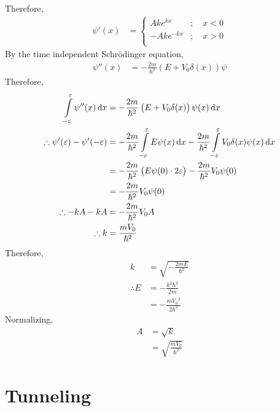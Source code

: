 \documentclass[titlepage, fleqn, a4paper, 12pt, twoside]{article}
\theoremstyle{definition}
\theoremstyle{theorem}
\begin{document}
Therefore,
\begin{align*}
	\psi'(x) &=
		\begin{cases}
			A k e^{k x} &;\quad x < 0\\
			-A k e^{-k x} &;\quad x > 0\\
		\end{cases}
\end{align*}
By the time independent Schrödinger equation,
\begin{align*}
	\psi''(x) &= -\frac{2 m}{\hbar^2} \left( E + V_0 \delta(x) \right) \psi
\end{align*}
Therefore,
\begin{align*}
	\int\limits_{-\varepsilon}^{\varepsilon} \psi''(x) \dif x &= -\frac{2 m}{\hbar^2} \left( E + V_0 \delta(x) \right) \psi(x) \dif x\\
	\therefore \psi'(\varepsilon) - \psi'(-\varepsilon) &= -\frac{2 m}{\hbar^2} \int\limits_{-\varepsilon}^{\varepsilon} E \psi(x) \dif x - \frac{2 m}{\hbar^2} \int\limits_{-\varepsilon}^{\varepsilon} V_0 \delta(x) \psi(x) \dif x\\
	&= -\frac{2 m}{\hbar^2} \left( E \psi(0) \cdot 2 \varepsilon \right) - \frac{2 m}{\hbar^2} V_0 \psi(0)\\
	&= -\frac{2 m}{\hbar^2} V_0 \psi(0)\\
	\therefore -k A - k A &= -\frac{2 m}{\hbar^2} V_0 A\\
	\therefore k &= \frac{m V_0}{\hbar^2}
\end{align*}
Therefore,
\begin{align*}
	k &= \sqrt{-\frac{2 m E}{\hbar^2}}\\
	\therefore E &= -\frac{k^2 \hbar^2}{2 m}\\
	&= -\frac{m {V_0}^2}{2 \hbar^2}
\end{align*}
Normalizing,
\begin{align*}
	A &= \sqrt{k}\\
	&= \sqrt{\frac{m V_0}{\hbar^2}}
\end{align*}

\section{Tunneling}
\end{document}
